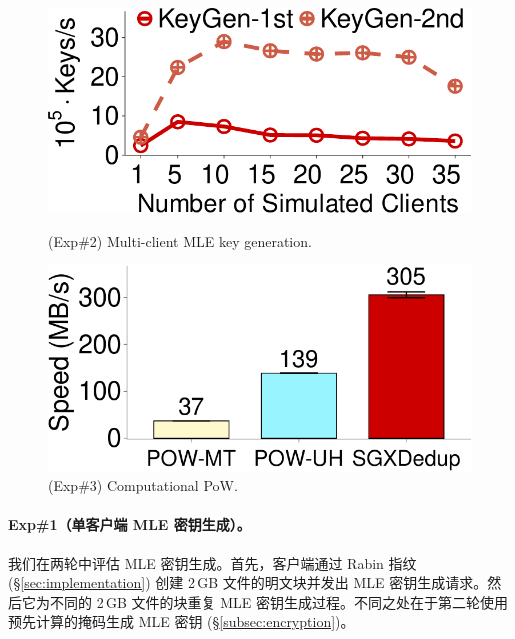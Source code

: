 \begin{figure}[!htb]
  \begin{minipage}[t]{0.47\textwidth}
  \centering
  \includegraphics[width=\linewidth]{pic/sgxdedup/expa3_keyScale_performance_number_multiThread.pdf}
  \vspace{-12pt}
  \caption{(Exp\#2) Multi-client MLE key generation.}
  \label{fig:exp-keygen-scalability}
  \end{minipage}%
  \hspace{0.2in}
  \begin{minipage}[t]{0.47\textwidth}
  \centering
  \includegraphics[width=\linewidth]{pic/sgxdedup/expa4_powPerformance.pdf}
  \vspace{-12pt}
  \caption{\small(Exp\#3) Computational PoW.}
  \label{fig:pow-comparison}
  \end{minipage}%
  \vspace{-6pt}
\end{figure}


\paragraph{Exp\#1（单客户端 MLE 密钥生成）。} 我们在两轮中评估 MLE 密钥生成。首先，客户端通过 Rabin 指纹 (\S\ref{sec:implementation}) 创建 2\,GB 文件的明文块并发出 MLE 密钥生成请求。然后它为不同的 2\,GB 文件的块重复 MLE 密钥生成过程。不同之处在于第二轮使用预先计算的掩码生成 MLE 密钥 (\S\ref{subsec:encryption})。

